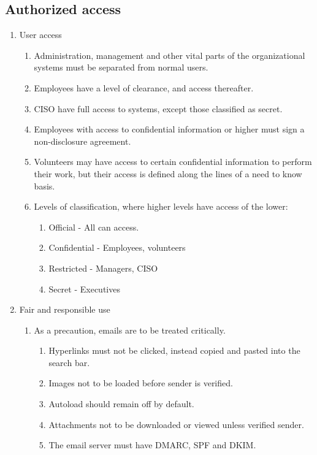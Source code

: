 \subsection{Authorized access}

\begin{enumerate}
  \item User access
  \begin{enumerate}
    \item Administration, management and other vital parts of the organizational systems must be separated from normal users.
    \item Employees have a level of clearance, and access thereafter. 
    \item CISO have full access to systems, except those classified as secret.
    \item Employees with access to confidential information or higher must sign a non-disclosure agreement.
    \item Volunteers may have access to certain confidential information to perform their work, but their access is defined along the lines of a need to know basis.
    \item Levels of classification, where higher levels have access of the lower:
    \begin{enumerate}
      \item Official - All can access.
      \item Confidential - Employees, volunteers
      \item Restricted - Managers, CISO
      \item Secret - Executives
    \end{enumerate}
  \end{enumerate}
  \item Fair and responsible use
  \begin{enumerate}
    \item As a precaution, emails are to be treated critically.
    \begin{enumerate}
      \item Hyperlinks must not be clicked, instead copied and pasted into the search bar.
      \item Images not to be loaded before sender is verified.
      \item Autoload should remain off by default.
      \item Attachments not to be downloaded or viewed unless verified sender.
      \item The email server must have DMARC, SPF and DKIM.

\end{enumerate}
\end{enumerate}
\end{enumerate}
